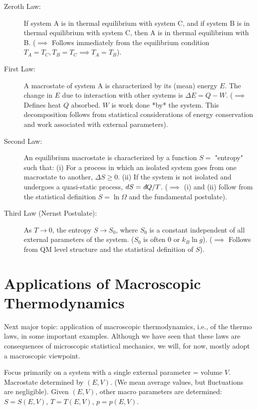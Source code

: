 \documentclass[11pt]{article}
\newcommand{\ethbar}{\text{\it{đ}}} %
\begin{document}
\begin{description}
    \item[Zeroth Law:] If system A is in thermal equilibrium with system C, and if system B is in thermal equilibrium with system C, then A is in thermal equilibrium with B.
        ($\implies$ Follows immediately from the equilibrium condition $T_A=T_C, T_B=T_C \implies T_A=T_B$).

    \item[First Law:] A macrostate of system A is characterized by its (mean) energy $E$. The change in $E$ due to interaction with other systems is $\Delta E = Q - W$.
        ($\implies$ Defines heat $Q$ absorbed. $W$ is work done *by* the system. This decomposition follows from statistical considerations of energy conservation and work associated with external parameters).

    \item[Second Law:] An equilibrium macrostate is characterized by a function $S=$ "entropy" such that:
        (i) For a process in which an isolated system goes from one macrostate to another, $\Delta S \ge 0$.
        (ii) If the system is not isolated and undergoes a quasi-static process, $dS = \ethbar Q / T$.
        ($\implies$ (i) and (ii) follow from the statistical definition $S=\ln \Omega$ and the fundamental postulate).

    \item[Third Law (Nernst Postulate):] As $T \to 0$, the entropy $S \to S_0$, where $S_0$ is a constant independent of all external parameters of the system. ($S_0$ is often 0 or $k_B \ln g$).
        ($\implies$ Follows from QM level structure and the statistical definition of $S$).
\end{description}

\section*{Applications of Macroscopic Thermodynamics}

Next major topic: application of macroscopic thermodynamics, i.e., of the thermo laws, in some important examples. Although we have seen that these laws are consequences of microscopic statistical mechanics, we will, for now, mostly adopt a macroscopic viewpoint.

Focus primarily on a system with a single external parameter = volume $V$. Macrostate determined by $(E, V)$. (We mean average values, but fluctuations are negligible).
Given $(E, V)$, other macro parameters are determined: $S=S(E,V)$, $T=T(E,V)$, $p=p(E,V)$.
\end{document}
